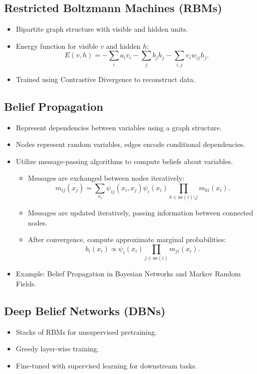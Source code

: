 \documentclass[12pt,a4paper]{article}
\begin{document}
\subsection{Restricted Boltzmann Machines (RBMs)}
\begin{itemize}
    \item Bipartite graph structure with visible and hidden units.
    \item Energy function for visible $v$ and hidden $h$:
    \[ E(v, h) = -\sum_i a_i v_i - \sum_j b_j h_j - \sum_{i,j} v_i w_{ij} h_j. \]
    \item Trained using Contrastive Divergence to reconstruct data.
\end{itemize}

\subsection{Belief Propagation}
\begin{itemize}
    \item Represent dependencies between variables using a graph structure.
    \item Nodes represent random variables, edges encode conditional dependencies.
    \item Utilize message-passing algorithms to compute beliefs about variables.
    \begin{itemize}
        \item Messages are exchanged between nodes iteratively:
        \[ m_{ij}(x_j) = \sum_{x_i} \psi_{ij}(x_i, x_j) \psi_i(x_i) \prod_{k \in \text{ne}(i) \setminus j} m_{ki}(x_i). \]
        \item Messages are updated iteratively, passing information between connected nodes.
        \item After convergence, compute approximate marginal probabilities:
        \[ b_i(x_i) \propto \psi_i(x_i) \prod_{j \in \text{ne}(i)} m_{ji}(x_i). \]
    \end{itemize}
    \item Example: Belief Propagation in Bayesian Networks and Markov Random Fields.
\end{itemize}
\subsection{Deep Belief Networks (DBNs)}
\begin{itemize}
    \item Stacks of RBMs for unsupervised pretraining.
    \item Greedy layer-wise training.
    \item Fine-tuned with supervised learning for downstream tasks.
\end{itemize}
\end{document}
